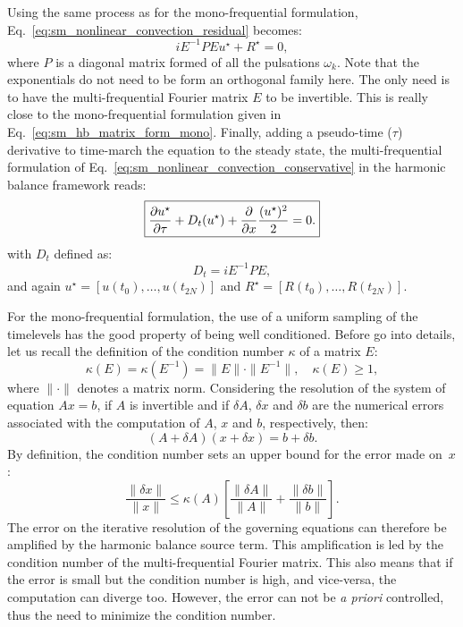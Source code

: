 Using the same process as for the mono-frequential formulation,
Eq.~\eqref{eq:sm_nonlinear_convection_residual} becomes:
\begin{equation}
	i E^{-1} P E u^\star + R^\star = 0,
\end{equation}
where $P$ is a diagonal matrix formed of all the pulsations $\omega_k$.
Note that the exponentials do not need to be form an
orthogonal family here. The only need is to have the multi-frequential
Fourier matrix $E$ to be invertible.
This is really close to the mono-frequential formulation given
in Eq.~\eqref{eq:sm_hb_matrix_form_mono}.
Finally, adding a pseudo-time ($\tau$) derivative 
to time-march the equation to the steady state,
the multi-frequential formulation of 
Eq.~\eqref{eq:sm_nonlinear_convection_conservative} in the harmonic
balance framework reads:
\begin{equation}
	\fbox{$
	\displaystyle \frac{\partial u^\star}{\partial \tau} +
	D_t (u^\star) + 
	\displaystyle \frac{\partial}{\partial x}
		\frac{(u^\star)^2}{2} = 0.
	$}
\end{equation}
with $D_t$ defined as:
\begin{equation}
	D_t = i E^{-1} P E,
\end{equation}
and again $u^\star = [u(t_0), \ldots, u(t_{2N})]$ 
and $R^\star = [R(t_0), \ldots, R(t_{2N})]$.

For the mono-frequential formulation, the use of a uniform
sampling of the timelevels has the good property of being
well conditioned.
Before go into details, let us recall the definition of the
condition number $\kappa$ of a matrix $E$:
\begin{equation}
	\kappa (E) = \kappa (E^{-1}) = \| E \| \cdot \| E^{-1} \|, \quad
    \kappa(E) \geq 1,
\end{equation}
where $\| \cdot \|$ denotes a matrix norm.  Considering the resolution
of the system of equation
$A x = b$, if $A$ is invertible and if $\delta A$, $\delta x$ and
$\delta b$ are the numerical errors associated with the computation of
$A$, $x$ and $b$, respectively, then:
\begin{equation}
   (A + \delta A)(x + \delta x) = b + \delta b.
   \label{eq:error_reso}
\end{equation}
By definition, the condition number sets an upper bound for 
the error made on~$x$:
\begin{equation}
   \frac{\| \delta x \|}{\| x \|} \leq 
   \kappa(A)\left[\frac{\| \delta A \|}{\| A \|} + 
   \frac{\| \delta b \|}{\| b \|} \right].
   \label{eq:conditonnig_amp}
\end{equation}
The error on the iterative resolution of the governing equations can
therefore be amplified by the harmonic balance source term. 
This amplification is
led by the condition number of the multi-frequential Fourier matrix. This
also means that if the error is small but the condition number is
high, and vice-versa, the computation can diverge too. However, the
error can not be \emph{a priori} controlled, thus the need to
minimize the condition number.

